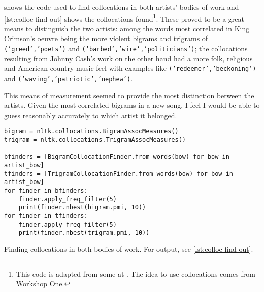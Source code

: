  shows the code used to find collocations in both artists' bodies of work and \cref{lst:colloc find out} shows the collocations found\footnote{This code is adapted from some at \cite{collocations-nltk}. The idea to use collocations comes from Workshop One.}. These proved to be a great means to distinguish the two artists: among the words most correlated in King Crimson's oeuvre being the more violent bigrams and trigrams of \texttt{('greed','poets')} and \texttt{('barbed','wire','politicians')}; the collocations resulting from Johnny Cash's work on the other hand had a more folk, religious and American country music feel with examples like \texttt{('redeemer','beckoning')} and \texttt{('waving','patriotic','nephew')}.

This means of measurement seemed to provide the most distinction between the artists. Given the most correlated bigrams in a new song, I feel I would be able to guess reasonably accurately to which artist it belonged.

\begin{listing}[h]
	\begin{verbatim}
bigram = nltk.collocations.BigramAssocMeasures()
trigram = nltk.collocations.TrigramAssocMeasures()

bfinders = [BigramCollocationFinder.from_words(bow) for bow in artist_bow]
tfinders = [TrigramCollocationFinder.from_words(bow) for bow in artist_bow]
for finder in bfinders:
	finder.apply_freq_filter(5)
	print(finder.nbest(bigram.pmi, 10))
for finder in tfinders:
	finder.apply_freq_filter(5)
	print(finder.nbest(trigram.pmi, 10))
	\end{verbatim}
\caption{Finding collocations in both bodies of work. For output, see \cref{lst:colloc find out}.}
\label{lst:colloc find}
\end{listing}

